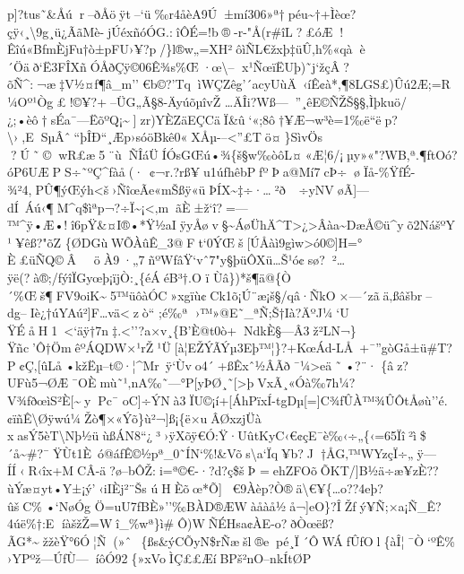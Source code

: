 p{]}?tus˜\&Åúr--ð\textquotesingle Åöÿt--`ü‰r4åèA9Ú±mí306»ª†péu\textasciitilde†+Ìèœ?çÿ‹¸\textbackslash9g¸ü¿ÃãMè-jÚéxñóÓG.:î ÔÉ=!b®-r-"Å(r\#îL?\textquotesingle£óÆ!Êîú«\textbar BfmÈjFu† ò±pFU›¥?p/\}l®w„=XH²ôìÑL€žxþ‡üÛ,h\%«qàè´Öäð`Ë3FÎX\textquotesingle ñÓÅðÇÿ©06Ê¾s\%Œ·œ\textbackslash--
x¹ÑœïËUþ)˜j`žçÂ?õÑ\^{}:¬æ‡V½¤ƒ¶â\_m''€b©?'TqìWÇZêg'´acyUùÄ~‹íÊ¢à*,¶8LGS£)Ûú2Æ;=R¼Oº¹Òg£!©¥?+--ÜG„Ã§8-ÄyúõµîvŽ
\ldots ÄÎi?Wß---''¸êE©ÑŽŠ§§,Ìþkuö/¿;•èô†sÉa¯---ËõºQ¡\textasciitilde{]}\textquotesinglezr)YÈZäEÇCäÏ\&û`«;8ô†¥Æ¬w³è=1‰ë``ëp?\textbackslash›,E\textbarSµÂˆ``þÎÐ``¸Æp›sóöBkê0« XÅµ-\/--\textless''£Tö¤\}SìvÖs
\textquotesingle?Ú˜©wR£æ5¨ùÑÎáÜÍÓsGŒú •¾\{š§w‰òôL¤«Æ¦6/¡µy»«"?WB,ª.¶ftOó?óP6UÆPS÷˜ºÇ\^{}ƒàå(·~¢¬r.?rß¥u1úfhêbPƒºÞa@Mí7cÞ÷\textquotesingle øÏå-\%ŸƒÉ-¾²4,PÛ¶ýŒýh\textless š›ÑîœÃe«mŠßÿ«üÞÍX\textasciitilde‡÷·\ldots²ð~÷yNVøÃ{]}---dÍ~Áú‹¶M\^{}q\$ìªp¬\textbar?÷Ï\textasciitilde¡\textless‚mãÈ±ž`î?=---™\^{}ÿ•Æ•!î6pŸ\&¤I®•*Ÿ½aIÿyÅøv§\textbar\textasciitilde ÁøÜhÄ\^{}T\textgreater¿\textgreater Âàa\textasciitilde DæÅ©ü\^{}yõ2NášºY¹¥êß?"õZ
\{ØDGùWÕÀûÊ\_3@Ft`0ÝŒš{[}ÚÅàì9gìw\textgreater ó0©{]}H=°
È£üÑQ©ÂöÀ9·„7ñºWfâŸ`v\textbar ˆ7"y§þüÔXü\ldots Š¹ó¢sø?²\textquotesingle\ldots ÿë(?à®;/fýîÏGyœþ¡ïjÒ:¸\{éÁéB³†.O
ï
Ùâ\})*š¶ä@\{Ò´\%Œš¶FV9oiK\textasciitilde5™üôàÓC»xgïù¢Ck1õ¡Ú¨æ¡š§/qâ·ÑkO×---´z ã ä‚ßâšbr--dg--Iè¿†úYAú²{]}F\ldots vä\textlesszò``
;é‰\textbar ª ›™»@E˜\_ªÑ;Š†Ià?ÄºJ¼`U
ŸÉåH 1~\textless`äÿ†7n‡.\textless''?a×v¸\{B'È@t0ò+NdkÈ§---Â3ž²LN¬\}Ÿñc'Ô†ÖmêºÁQDW×¹rŽ¹Ü{[}à¦EŽÝÃÝµ3Eþ\textquotesingle™¦\}?+KœÁd-LÅ~+¯''gòGå±ü\#T?P¢Ç‚{[}ûLå•kžËµ--t©·¦\^{}Mr~ÿ`Ùvo4´+ßÊ\textquotesingle xˆ½ÂÃð¯¼\textgreater eä˜•?¨·
\{âz ?UFù5¬ØÆ¯OÈmù˜¹‚nA‰˜---°P{[}yÞ\textbar Ø¸˜{[}\textgreater þVxÃ¸\textquotesingle«Óà‰7h¼?V¾fðœìS²È{[}\textasciitilde{}yPc¯
oC{]}÷ÝNà3ÏU©¡í+{[}ÁhPïxÍ -tgDµ{[}={]}C¾fÛÀ™¾ÛÔtÅøù''é. ¢ïñÊ \textbackslash Øÿwú¼Žò¶×«Ýõ\}ù²¬{]}ß¡\{ë×uÂØxz\textbar jÜà
xasÝ5èT\textbackslash Nþ½üùßÁN8``¿³›ÿXõÿ€Ó:Ÿ·UûtKy\textquotesingle C‹€¢çE¯è‰‹÷\textbar@„\{‹=65Ïî²ì\$´å\textasciitilde\#?¯ŸÙt1È~ó@áfÊ©½pª\_0˜ÍN`\%!\&Võs\textbackslash a`Ïq¥b?J†ÅG‚™WYzçÏ÷„ÿ---ÍÍ‹R‹î\textbar x+MCÂ-ä?ø--bÔŽ:i=ª©€-·?d?ç\$šÞ
=ehZFOõÕKT/{]}B½ä÷æ¥zÈ??ùÝæ¤yt•Y±¡ý'‹\textbar iIÈj²¨Šs
úHÈõœ*Õ{]}€9Àèp?Ò®ä\textbackslash€¥\{\ldots o??4eþ?ûšC\%•`NøÓg
Ö=uU7fBÈ»''‰BÀD®ÆWàåàå½å¬{]}eO\}?ÎŽfý¥Ñ;×a¡Ñ\_Ê?4úë\%†:E
íàšžŽ=Wî\_\%wª\}ì\#Ô)WÑÉHsa¢ÀE-o?ðÒœëß?ÃG*\textasciitildežžèŸ°6Ó¦Ñ(»ˆ~\{ßs\&ýCÕyN\$rÑæšl®epé¸Ï´ÔWÁfÛƒOl\{àÎ¦¯Ò`ºÊ\%›YPºž---Ú\textbar ƒÙ\textbar---íô\textbar Ó92\{»xVoÌÇ££ÆíBPš²nO--n­kÍtØP
